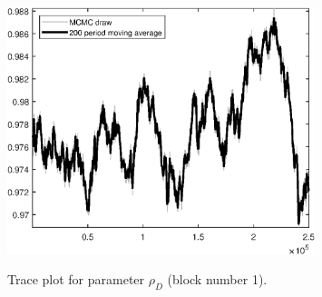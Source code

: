 \begin{figure}[H]
\centering
  \includegraphics[width=0.8\textwidth]{BRS_growth_ext_util/graphs/TracePlot_rho_D_blck_1}\\
    \caption{Trace plot for parameter ${\rho_D}$ (block number 1).}
\end{figure}

